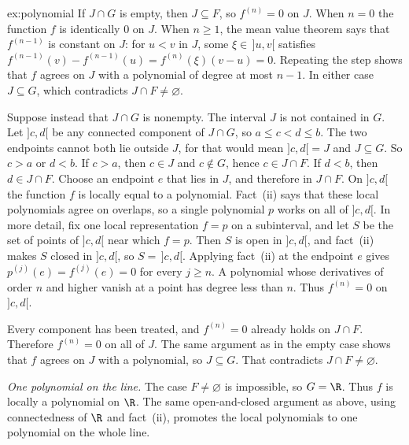 \begin{solution}{ex:polynomial}
If $J\cap G$ is empty, then $J\subseteq F$, so $f^{(n)}=0$ on $J$. When $n=0$ the function $f$ is identically $0$ on $J$. When $n\ge1$, the mean value theorem says that $f^{(n-1)}$ is constant on $J$: for $u<v$ in $J$, some $\xi\in\,]u,v[$ satisfies $f^{(n-1)}(v)-f^{(n-1)}(u)=f^{(n)}(\xi)(v-u)=0$. Repeating the step shows that $f$ agrees on $J$ with a polynomial of degree at most $n-1$. In either case $J\subseteq G$, which contradicts $J\cap F\ne\varnothing$.

Suppose instead that $J\cap G$ is nonempty. The interval $J$ is not contained in $G$. Let $]c,d[$ be any connected component of $J\cap G$, so $a\le c<d\le b$. The two endpoints cannot both lie outside $J$, for that would mean $]c,d[=J$ and $J\subseteq G$. So $c>a$ or $d<b$. If $c>a$, then $c\in J$ and $c\notin G$, hence $c\in J\cap F$. If $d<b$, then $d\in J\cap F$. Choose an endpoint $e$ that lies in $J$, and therefore in $J\cap F$. On $]c,d[$ the function $f$ is locally equal to a polynomial. Fact~(ii) says that these local polynomials agree on overlaps, so a single polynomial $p$ works on all of $]c,d[$. In more detail, fix one local representation $f=p$ on a subinterval, and let $S$ be the set of points of $]c,d[$ near which $f=p$. Then $S$ is open in $]c,d[$, and fact~(ii) makes $S$ closed in $]c,d[$, so $S=\,]c,d[$. Applying fact~(ii) at the endpoint $e$ gives $p^{(j)}(e)=f^{(j)}(e)=0$ for every $j\ge n$. A polynomial whose derivatives of order $n$ and higher vanish at a point has degree less than $n$. Thus $f^{(n)}=0$ on $]c,d[$.

Every component has been treated, and $f^{(n)}=0$ already holds on $J\cap F$. Therefore $f^{(n)}=0$ on all of $J$. The same argument as in the empty case shows that $f$ agrees on $J$ with a polynomial, so $J\subseteq G$. That contradicts $J\cap F\ne\varnothing$.

\emph{One polynomial on the line.} The case $F\ne\varnothing$ is impossible, so $G=\R$. Thus $f$ is locally a polynomial on $\R$. The same open-and-closed argument as above, using connectedness of $\R$ and fact~(ii), promotes the local polynomials to one polynomial on the whole line.
\end{solution}

